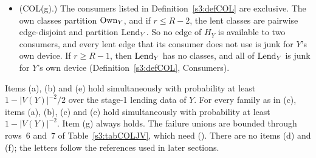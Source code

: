\begin{lemma}
\begin{itemize}
  $(2^{-6},s')$-expander with $s':=s_r/(16\kown)\ge2^{145}L_Y^{41}$ and
  $2\lceil L_Y^6\rceil\le s'$.
\item[(g)] (COL(g).) The consumers listed in Definition~\ref{s3:defCOL}
  are exclusive. The own classes partition $\mathrm{Own}_Y$, and if $r\le R-2$,
  the lent classes are pairwise edge-disjoint and partition $\mathrm{Lend}_Y$. So
  no edge of $H_Y$ is available to two consumers, and every lent edge
  that its consumer does not use is junk for $Y$'s own device. If
  $r\ge R-1$, then $\mathrm{Lend}_Y$ has no classes, and all of $\mathrm{Lend}_Y$ is junk
  for $Y$'s own device (Definition~\ref{s3:defCOL}, Consumers).
\end{itemize}
Items (a), (b) and (e) hold simultaneously with probability at least
$1-|V(Y)|^{-2}/2$ over the stage-1 lending data of $Y$. For every family
as in (c), items (a), (b), (c) and (e) hold simultaneously with
probability at least $1-|V(Y)|^{-2}$. Item (g) always holds. The failure
unions are bounded through rows~6 and~7 of Table~\ref{s3:tabCOLJV}, which
need  (). There are no items (d) and (f); the letters
follow the references used in later sections.
\deps{\ref{s3:defCOL}, \ref{s3:lemL15p}, \ref{s3:thmT16s}, \ref{s3:lemMonotone}, \ref{s3:lemCOLJV}, \ref{s2:lemTower}, \ref{s2:propStructure}, \ref{s2:defAncestors}, \ref{s1:condG1}}
\end{lemma}

